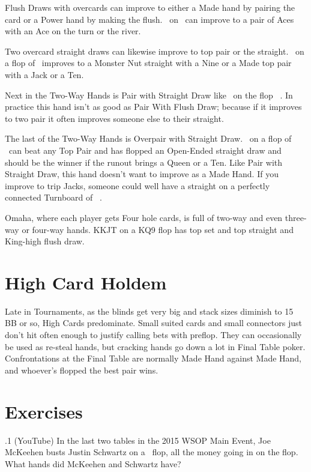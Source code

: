 Flush Draws with overcards can improve to either a Made hand by
pairing the card or a Power hand by making the flush. \Ad\sevd\ on
\Kc\nined\eigd\ can improve to a pair of Aces with an Ace on the turn
or the river.

Two overcard straight draws can likewise improve to top pair or the
straight. \Jh\tenc\ on a flop of \eigh\sevc\tres\ improves to a Monster
Nut straight with a Nine or a Made top pair with a Jack or a Ten.

Next in the Two-Way Hands is Pair with Straight Draw like
\tend\nined\ on the flop \tenc\eigh\sevs\ . In practice this hand
isn't as good as Pair With Flush Draw; because if it improves to two
pair it often improves someone else to their straight.

The last of the Two-Way Hands is Overpair with Straight
Draw. \Js\Jc\ on a flop of \tenc\nineh\eigs\ can beat any Top Pair
and has flopped an Open-Ended straight draw and should be the winner
if the runout brings a Queen or a Ten. Like Pair with Straight Draw,
this hand doesn't want to improve as a Made Hand. If you improve to
trip Jacks, someone could well have a straight on a perfectly
connected Turnboard of \tenc\nineh\eigs\Jh\ .

Omaha, where each player gets Four hole cards, is full of two-way
and even three-way or four-way hands. KKJT on a KQ9 flop has top
set and top straight and King-high flush draw.

\section{High Card Holdem}

Late in Tournaments, as the blinds get very big and stack sizes diminish
to 15 BB or so, High Cards predominate. Small suited cards and small
connectors just don't hit often enough to justify calling bets with
preflop. They can occasionally be used as re-steal hands, but cracking
hands go down a lot in Final Table poker. Confrontations at the Final
Table are normally Made Hand against Made Hand, and whoever's flopped
the best pair wins.

\section{Exercises}


.1 (YouTube) In the last two tables in the 2015 WSOP
Main Event, Joe McKeehen busts Justin Schwartz on a
\sixh\tred\twod\ flop, all the money going in on the flop. What hands
did McKeehen and Schwartz have?
